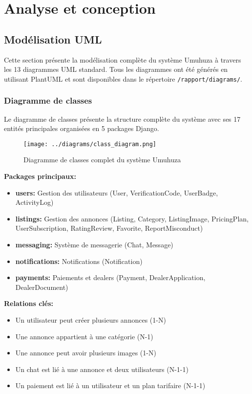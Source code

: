 \chapter{Analyse et conception}

\section{Modélisation UML}

Cette section présente la modélisation complète du système Umuhuza à travers les 13 diagrammes UML standard. Tous les diagrammes ont été générés en utilisant PlantUML et sont disponibles dans le répertoire \texttt{/rapport/diagrams/}.

\subsection{Diagramme de classes}

Le diagramme de classes présente la structure complète du système avec ses 17 entités principales organisées en 5 packages Django.

\begin{figure}[H]
\centering
\texttt{[image: ../diagrams/class\_diagram.png]}
\caption{Diagramme de classes complet du système Umuhuza}
\label{fig:class_diagram}
\end{figure}

\textbf{Packages principaux:}
\begin{itemize}
    \item \textbf{users:} Gestion des utilisateurs (User, VerificationCode, UserBadge, ActivityLog)
    \item \textbf{listings:} Gestion des annonces (Listing, Category, ListingImage, PricingPlan, UserSubscription, RatingReview, Favorite, ReportMisconduct)
    \item \textbf{messaging:} Système de messagerie (Chat, Message)
    \item \textbf{notifications:} Notifications (Notification)
    \item \textbf{payments:} Paiements et dealers (Payment, DealerApplication, DealerDocument)
\end{itemize}

\textbf{Relations clés:}
\begin{itemize}
    \item Un utilisateur peut créer plusieurs annonces (1-N)
    \item Une annonce appartient à une catégorie (N-1)
    \item Une annonce peut avoir plusieurs images (1-N)
    \item Un chat est lié à une annonce et deux utilisateurs (N-1-1)
    \item Un paiement est lié à un utilisateur et un plan tarifaire (N-1-1)
\end{itemize}

